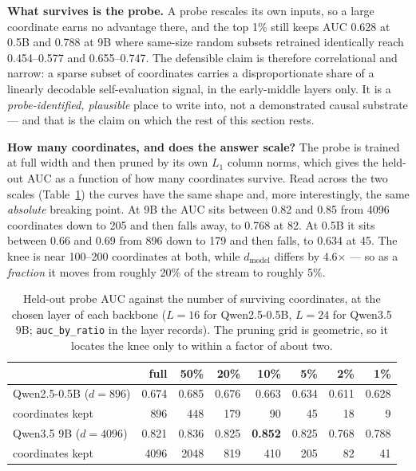 \documentclass[11pt]{article}
\newcommand{\code}[1]{\texttt{#1}}
\begin{document}
\textbf{What survives is the probe.} A probe rescales its own inputs, so a large coordinate earns no advantage there, and the top 1\% still keeps AUC 0.628 at 0.5B and 0.788 at 9B where same-size random subsets retrained identically reach 0.454--0.577 and 0.655--0.747. The defensible claim is therefore correlational and narrow: a sparse subset of coordinates carries a disproportionate share of a linearly decodable self-evaluation signal, in the early-middle layers only. It is a \emph{probe-identified, plausible} place to write into, not a demonstrated causal substrate --- and that is the claim on which the rest of this section rests.

\textbf{How many coordinates, and does the answer scale?} The probe is trained at
full width and then pruned by its own $L_1$ column norms, which gives the held-out
AUC as a function of how many coordinates survive. Read across the two scales
(Table~\ref{tab:vnknee}) the curves have the same shape and, more interestingly, the
same \emph{absolute} breaking point. At 9B the AUC sits between 0.82 and 0.85 from
4096 coordinates down to 205 and then falls away, to 0.768 at 82. At 0.5B it sits
between 0.66 and 0.69 from 896 down to 179 and then falls, to 0.634 at 45. The knee
is near 100--200 coordinates at both, while $d_{\mathrm{model}}$ differs by
4.6$\times$ --- so as a \emph{fraction} it moves from roughly 20\% of the stream to
roughly 5\%.

\begin{table}[t]
\centering
\caption{Held-out probe AUC against the number of surviving coordinates, at the
chosen layer of each backbone ($L{=}16$ for Qwen2.5-0.5B, $L{=}24$ for Qwen3.5 9B;
\code{auc\_by\_ratio} in the layer records). The pruning grid is geometric, so it
locates the knee only to within a factor of about two.}
\label{tab:vnknee}
\small
\begin{tabular}{lrrrrrrr}
\toprule
& full & 50\% & 20\% & 10\% & 5\% & 2\% & 1\% \\
\midrule
Qwen2.5-0.5B ($d = 896$) & 0.674 & 0.685 & 0.676 & 0.663 & 0.634 & 0.611 & 0.628 \\
\quad coordinates kept & 896 & 448 & 179 & 90 & 45 & 18 & 9 \\
Qwen3.5 9B ($d = 4096$) & 0.821 & 0.836 & 0.825 & \textbf{0.852} & 0.825 & 0.768 & 0.788 \\
\quad coordinates kept & 4096 & 2048 & 819 & 410 & 205 & 82 & 41 \\
\bottomrule
\end{tabular}
\end{table}
\end{document}
